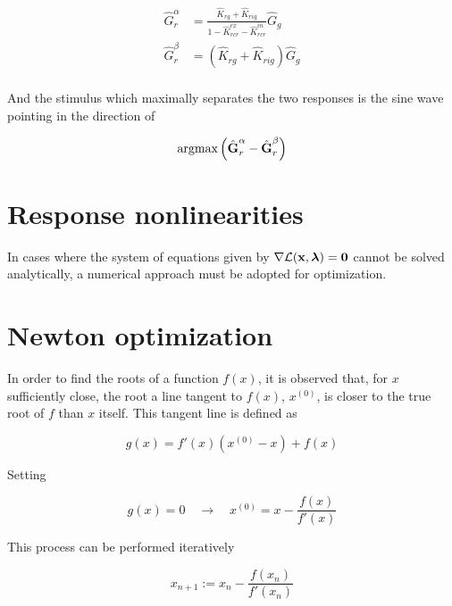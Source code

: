\documentclass{article}
\newcommand{\Lagr}{\mathcal{L}}
\newcommand{\vect}[1]{\textbf{\textrm{#1}}}
\begin{document}
\begin{align*}
	\hat{G}_r^\alpha & = \frac{\hat{K}_{rg} + \hat{K}_{rig}}
					   {1 - \hat{K}_{rcr}^{ex} - \hat{K}_{rcr}^{in}} \hat{G}_g \\
	\hat{G}_r^\beta & = \left( \hat{K}_{rg} + \hat{K}_{rig} \right) \hat{G}_g \\
\end{align*}

And the stimulus which maximally separates the two responses is the sine wave pointing in the direction of

\begin{equation*}
	\text{argmax}\left( \hat{\vect{G}}_r^\alpha - \hat{\vect{G}}_r^\beta \right)
\end{equation*}



\section{Response nonlinearities}
\yel{[...]}

In cases where the system of equations given by $\nabla \Lagr(\vect{x},\bm{\lambda}) = \vect{0}$ cannot be solved analytically, a numerical approach must be adopted for optimization.

\section{Newton optimization} \label{newtonmethod}
In order to find the roots of a function $f(x)$, it is observed that, for $x$ sufficiently close, the root a line tangent to $f(x)$, $x^{(0)}$, is closer to the true root of $f$ than $x$ itself. 
This tangent line is defined as

\begin{equation} \label{tangent1d}
	g(x) = f'(x)(x^{(0)} - x) + f(x)
\end{equation}

Setting

\begin{equation*}
	g(x) = 0 \quad \longrightarrow \quad x^{(0)} = x - \frac{f(x)}{f'(x)}
\end{equation*}

This process can be performed iteratively

\begin{equation} \label{updaterule1d}
	x_{n+1} := x_n - \frac{f(x_n)}{f'(x_n)}
\end{equation}
\end{document}
